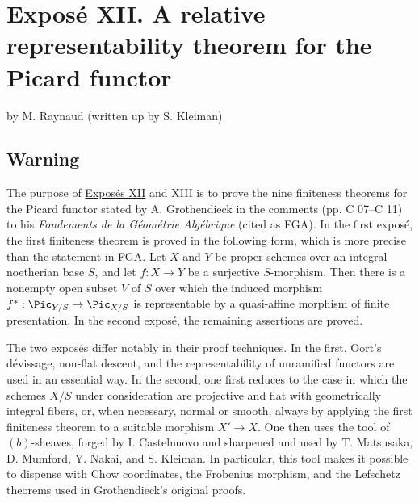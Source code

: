 \providecommand{\Hom}{\operatorname{Hom}}
\providecommand{\Isom}{\operatorname{Isom}}
\providecommand{\Coker}{\operatorname{Coker}}
\providecommand{\Ass}{\operatorname{Ass}}
\providecommand{\sgacircled}[1]{\tikz[baseline=(char.base)]\node[shape=circle,draw,inner sep=.35pt](char){\mbox{\scriptsize #1}};}
\newpage
\section*{Expos\'e XII. A relative representability theorem for the Picard functor}
\begin{center}
by M. Raynaud (written up by S. Kleiman)
\end{center}

\subsection*{Warning}

The purpose of \hyperlink{sga6.e12.expose}{Expos\'es XII} and XIII is to prove the nine finiteness theorems
for the Picard functor stated by A. Grothendieck in the comments
(pp. C 07--C 11) to his \emph{Fondements de la G\'eom\'etrie Alg\'ebrique}
(cited as FGA). In the first expos\'e, the first finiteness theorem is proved
in the following form, which is more precise than the statement in FGA. Let
$X$ and $Y$ be proper schemes over an integral noetherian base $S$, and let
$f:X\to Y$ be a surjective $S$-morphism. Then there is a nonempty open subset
$V$ of $S$ over which the induced morphism
$f^*:\Pic_{Y/S}\to\Pic_{X/S}$ is representable by a quasi-affine morphism of
finite presentation. In the second expos\'e, the remaining assertions are
proved.

The two expos\'es differ notably in their proof techniques. In the first,
Oort's d\'evissage, non-flat descent, and the representability of unramified
functors are used in an essential way. In the second, one first reduces to
the case in which the schemes $X/S$ under consideration are projective and
flat with geometrically integral fibers, or, when necessary, normal or
smooth, always by applying the first finiteness theorem to a suitable
morphism $X'\to X$. One then uses the tool of $(b)$-sheaves, forged by
I. Castelnuovo and sharpened and used by T. Matsusaka, D. Mumford, Y. Nakai,
and S. Kleiman. In particular, this tool makes it possible to dispense with
Chow coordinates, the Frobenius morphism, and the Lefschetz theorems used in
Grothendieck's original proofs.

